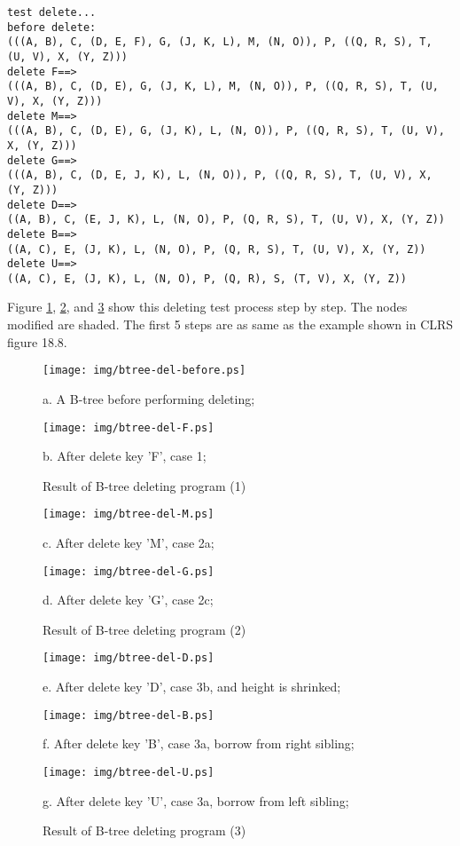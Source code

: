 \documentclass{article}
\begin{document}
\begin{verbatim}
test delete...
before delete:
(((A, B), C, (D, E, F), G, (J, K, L), M, (N, O)), P, ((Q, R, S), T, (U, V), X, (Y, Z)))
delete F==>
(((A, B), C, (D, E), G, (J, K, L), M, (N, O)), P, ((Q, R, S), T, (U, V), X, (Y, Z)))
delete M==>
(((A, B), C, (D, E), G, (J, K), L, (N, O)), P, ((Q, R, S), T, (U, V), X, (Y, Z)))
delete G==>
(((A, B), C, (D, E, J, K), L, (N, O)), P, ((Q, R, S), T, (U, V), X, (Y, Z)))
delete D==>
((A, B), C, (E, J, K), L, (N, O), P, (Q, R, S), T, (U, V), X, (Y, Z))
delete B==>
((A, C), E, (J, K), L, (N, O), P, (Q, R, S), T, (U, V), X, (Y, Z))
delete U==>
((A, C), E, (J, K), L, (N, O), P, (Q, R), S, (T, V), X, (Y, Z))
\end{verbatim}

Figure \ref{fig:result-del1}, \ref{fig:result-del2}, and \ref{fig:result-del3}
show this deleting test process step by step. The nodes modified are shaded.
The first 5 steps are as same as the example shown in CLRS figure 18.8.

\begin{figure}[htbp]
    \begin{center}
      \texttt{[image: img/btree-del-before.ps]}

      a. A B-tree before performing deleting;

      \texttt{[image: img/btree-del-F.ps]}

      b. After delete key 'F', case 1; 
      \caption{Result of B-tree deleting program (1)} \label{fig:result-del1}
    \end{center}
\end{figure}

\begin{figure}[htbp]
    \begin{center}
      \texttt{[image: img/btree-del-M.ps]}

      c. After delete key 'M', case 2a;

      \texttt{[image: img/btree-del-G.ps]}

      d. After delete key 'G', case 2c; 
      \caption{Result of B-tree deleting program (2)} \label{fig:result-del2}
    \end{center}
\end{figure}

\begin{figure}[htbp]
    \begin{center}
      \texttt{[image: img/btree-del-D.ps]}

      e. After delete key 'D', case 3b, and height is shrinked;

      \texttt{[image: img/btree-del-B.ps]}

      f. After delete key 'B', case 3a, borrow from right sibling; 

      \texttt{[image: img/btree-del-U.ps]}

      g. After delete key 'U', case 3a, borrow from left sibling; 

      \caption{Result of B-tree deleting program (3)} \label{fig:result-del3}
    \end{center}
\end{figure}
\end{document}
